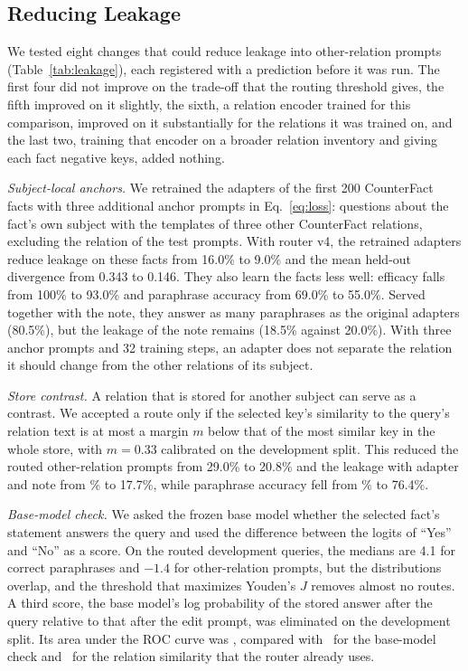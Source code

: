 \documentclass[journal,10pt]{IEEEtran}
\begin{document}
\subsection{Reducing Leakage}
\label{sec:leak}




We tested eight changes that could reduce leakage into other-relation prompts
(Table~\ref{tab:leakage}), each registered with a prediction before it was run. The
first four did not improve on the trade-off that the routing threshold gives, the fifth
improved on it slightly, the sixth, a relation encoder trained for this comparison,
improved on it substantially for the relations it was trained on, and the last two,
training that encoder on a broader relation inventory and giving each fact negative keys,
added nothing.

\emph{Subject-local anchors.} We retrained the adapters of the first 200 CounterFact facts
with three additional anchor prompts in Eq.~\eqref{eq:loss}: questions about the fact's
own subject with the templates of three other CounterFact relations, excluding the
relation of the test prompts. With router v4, the retrained adapters reduce leakage on
these facts from 16.0\% to 9.0\% and the mean held-out divergence from 0.343 to 0.146.
They also learn the facts less well: efficacy falls from 100\% to 93.0\% and paraphrase
accuracy from 69.0\% to 55.0\%. Served together with the note, they answer as many
paraphrases as the original adapters (80.5\%), but the leakage of the note remains
(18.5\% against 20.0\%). With three anchor prompts and 32 training steps, an adapter does
not separate the relation it should change from the other relations of its subject.

\emph{Store contrast.} A relation that is stored for another subject can serve as a
contrast. We accepted a route only if the selected key's similarity to the query's
relation text is at most a margin $m$ below that of the most similar key in the whole
store, with $m=0.33$ calibrated on the development split. This reduced the routed
other-relation prompts from 29.0\% to 20.8\% and the leakage with adapter and note from
\vCfEthreeLeakBothPct\% to 17.7\%, while paraphrase accuracy fell from \vCfParaBothPct\%
to 76.4\%.

\emph{Base-model check.} We asked the frozen base model whether the selected fact's
statement answers the query and used the difference between the logits of ``Yes'' and
``No'' as a score. On the routed development queries, the medians are 4.1 for correct
paraphrases and $-1.4$ for other-relation prompts, but the distributions overlap, and
the threshold that maximizes Youden's $J$ removes almost no routes. A third score, the
base model's log probability of the stored answer after the query relative to that after
the edit prompt, was eliminated on the development split. Its area under the ROC curve
was \aucTypePool, compared with \aucJudgePool\ for the base-model check and \aucRelPool\
for the relation similarity that the router already uses.
\end{document}
